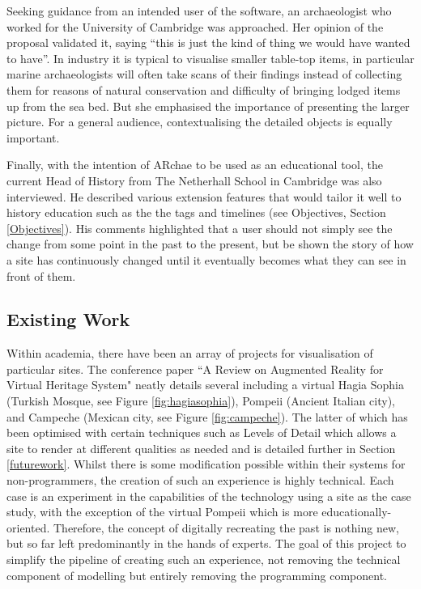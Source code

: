 \documentclass[12pt, a4paper]{article}
\begin{document}
Seeking guidance from an intended user of the software, an archaeologist who worked for the University of Cambridge was approached. Her opinion of the proposal validated it, saying ``this is just the kind of thing we would have wanted to have''. In industry it is typical to visualise smaller table-top items, in particular marine archaeologists will often take scans of their findings instead of collecting them for reasons of natural conservation and difficulty of bringing lodged items up from the sea bed. But she emphasised the importance of presenting the larger picture. For a general audience, contextualising the detailed objects is equally important. 

Finally, with the intention of ARchae to be used as an educational tool, the current Head of History from The Netherhall School in Cambridge was also interviewed. He described various extension features that would tailor it well to history education such as the the tags and timelines (see Objectives, Section \ref{Objectives}). His comments highlighted that a user should not simply see the change from some point in the past to the present, but be shown the story of how a site has continuously changed until it eventually becomes what they can see in front of them.

\subsection{Existing Work}
\label{existingwork}
Within academia, there have been an array of projects for visualisation of particular sites. The conference paper ``A Review on Augmented Reality for Virtual Heritage System" \cite{existing:virtualhertitagereview} neatly details several including a virtual Hagia Sophia \cite{existing:hagia} (Turkish Mosque, see Figure \ref{fig:hagiasophia}), Pompeii \cite{existing:pompeii} (Ancient Italian city), and Campeche 
\cite{existing:campeche} (Mexican city, see Figure \ref{fig:campeche}). The latter of which has been optimised with certain techniques such as Levels of Detail which allows a site to render at different qualities as needed and is detailed further in Section \ref{futurework}. Whilst there is some modification possible within their systems for non-programmers, the creation of such an experience is highly technical. Each case is an experiment in the capabilities of the technology using a site as the case study, with the exception of the virtual Pompeii which is more educationally-oriented. Therefore, the concept of digitally recreating the past is nothing new, but so far left predominantly in the hands of experts. The goal of this project to simplify the pipeline of creating such an experience, not removing the technical component of modelling but entirely removing the programming component.
\end{document}
